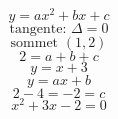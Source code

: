 \documentclass{article}
\begin{document}
\[ y = ax^2+bx+c \]
\[ \text{tangente: } \Delta = 0 \]
\[ \text{sommet } (1,2) \]
\[ 2 = a+b+c \]
\[ y = x+3 \]
\[ y = ax+b \]
\[ 2-4 = -2 = c \]
\[ x^2+3x-2 = 0 \]
\end{document}
